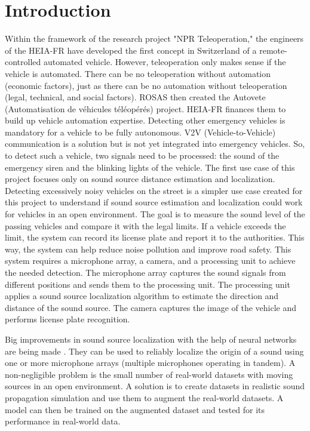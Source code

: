 \chapter{Introduction}
\label{ch:introduction}
Within the framework of the research project "NPR Teleoperation," the engineers of the HEIA-FR have developed the first concept in Switzerland of a remote-controlled automated vehicle. However, teleoperation only makes sense if the vehicle is automated. There can be no teleoperation without automation (economic factors), just as there can be no automation without teleoperation (legal, technical, and social factors). ROSAS then created the Autovete (Automatisation de véhicules téléopérés) project. HEIA-FR finances them to build up vehicle automation expertise. Detecting other emergency vehicles is mandatory for a vehicle to be fully autonomous. V2V (Vehicle-to-Vehicle) communication is a solution but is not yet integrated into emergency vehicles.
So, to detect such a vehicle, two signals need to be processed: the sound of the emergency siren and the blinking lights of the vehicle. The first use case of this project focuses only on sound source distance estimation and localization. Detecting excessively noisy vehicles on the street is a simpler use case created for this project to understand if sound source estimation and localization could work for vehicles in an open environment. The goal is to measure the sound level of the passing vehicles and compare it with the legal limits. If a vehicle exceeds the limit, the system can record its license plate and report it to the authorities. This way, the system can help reduce noise pollution and improve road safety. This system requires a microphone array, a camera, and a processing unit to achieve the needed detection. The microphone array captures the sound signals from different positions and sends them to the processing unit. The processing unit applies a sound source localization algorithm to estimate the direction and distance of the sound source. The camera captures the image of the vehicle and performs license plate recognition. 

Big improvements in sound source localization with the help of neural networks are being made \cite{Grumiaux_2022}. They can be used to reliably localize the origin of a sound using one or more microphone arrays (multiple microphones operating in tandem). A non-negligible problem is the small number of real-world datasets with moving sources in an open environment. A solution is to create datasets in realistic sound propagation simulation and use them to augment the real-world datasets. A model can then be trained on the augmented dataset and tested for its performance in real-world data. 

